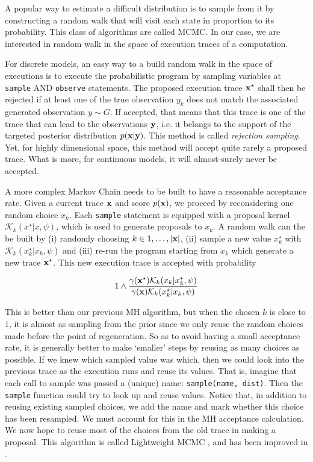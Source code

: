 A popular way to estimate a difficult distribution is to sample from it by constructing a random walk that will visit each state in proportion to its probability. This class of algorithms are called \gls{MCMC}.
In our case, we are interested in random walk in the space of execution traces of a computation.

For discrete models, an easy way to a build random walk in the space of executions is to execute the probabilistic program by sampling variables at \texttt{sample} AND \texttt{observe} statements. The proposed execution trace $\boldsymbol{\mathbf{x}}^\star$ shall then be rejected if at least one of the true observation $y_k$ does not match the associated generated observation $y \sim G$. If accepted, that means that this trace is one of the trace that can lead to the observations $\boldsymbol{\mathbf{y}}$, i.e. it belongs to the support of the targeted posterior distribution $p(\boldsymbol{\mathbf{x}}|\boldsymbol{\mathbf{y}})$. This method is called \textit{rejection sampling}. Yet, for highly dimensional space, this method will accept quite rarely a proposed trace. What is more, for continuous models, it will almost-surely never be accepted.


A more complex Markov Chain needs to be built to have a reasonable acceptance rate.
Given a current trace $\boldsymbol{\mathbf{x}}$ and score $p(\boldsymbol{\mathbf{x}})$, we proceed by reconsidering one random choice $x_k$.
Each \texttt{sample} statement is equipped with a proposal kernel $\mathcal{K}_k(x^\star|x, \psi)$, which is used to generate proposals to $x_k$. A random walk can the be built by (i) randomly choosing $k \in {1,\dots,|\ensuremath{\boldsymbol{\mathbf{x}}}|}$, (ii) sample a new value $x_k^\star$ with $\mathcal{K}_k(x_k^\star|x_k, \psi)$ and (iii) re-run the program starting from $x_k$ which generate a new trace $\boldsymbol{\mathbf{x}}^\star$. This new execution trace is accepted with probability

$$ 1 \wedge \frac{\gamma(\boldsymbol{\mathbf{x}}^\star) \mathcal{K}_k(x_k|x_k^\star, \psi)}{\gamma(\boldsymbol{\mathbf{x}}) \mathcal{K}_k(x_k^\star|x_k, \psi)} $$

This is better than our previous \gls{MH} algorithm, but when the chosen $k$ is close to $1$, it is almost as sampling from the prior since we only reuse the random choices made before the point of regeneration. So as to avoid having a small acceptance rate, it is generally better to make ‘smaller’ steps by reusing as many choices as possible. If we knew which sampled value was which, then we could look into the previous trace as the execution runs and reuse its values. That is, imagine that each call to sample was passed a (unique) name: \texttt{sample(name, dist)}. Then the \texttt{sample} function could try to look up and reuse values.
Notice that, in addition to reusing existing sampled choices, we add the name and mark whether this choice has been resampled. We must account for this in the \gls{MH} acceptance calculation.
We now hope to reuse most of the choices from the old trace in making a proposal.
This algorithm is called Lightweight \gls{MCMC} \cite{Wingate:2011ul}, and has been improved in \cite{Ritchie:2015tx}.

